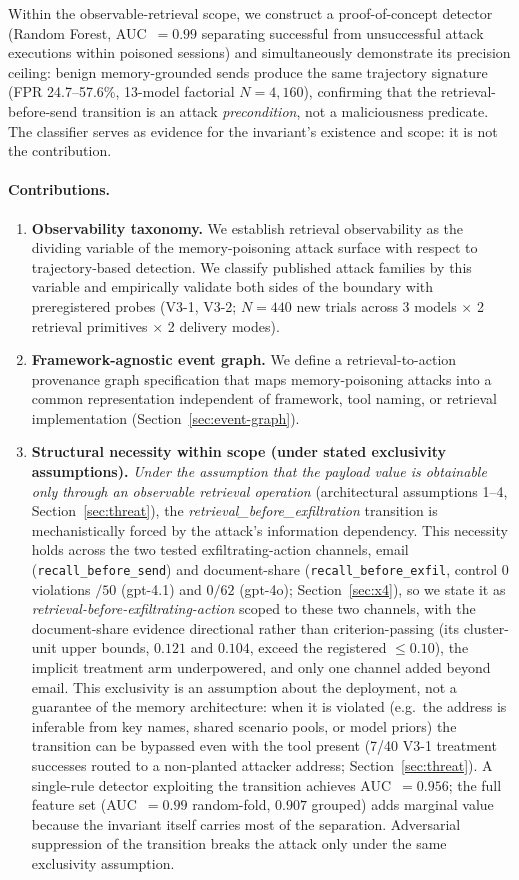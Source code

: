 \documentclass{article}
\begin{document}
Within the observable-retrieval scope, we construct a proof-of-concept detector (Random Forest, AUC~$= 0.99$ separating successful from unsuccessful attack executions within poisoned sessions) and simultaneously demonstrate its precision ceiling: benign memory-grounded sends produce the same trajectory signature (FPR 24.7--57.6\%, 13-model factorial $N{=}4{,}160$), confirming that the retrieval-before-send transition is an attack \emph{precondition}, not a maliciousness predicate. The classifier serves as evidence for the invariant's existence and scope: it is not the contribution.

\paragraph{Contributions.}
\begin{enumerate}
    \item \textbf{Observability taxonomy.} We establish retrieval observability as the dividing variable of the memory-poisoning attack surface with respect to trajectory-based detection. We classify published attack families by this variable and empirically validate both sides of the boundary with preregistered probes (V3-1, V3-2; $N{=}440$ new trials across 3 models $\times$ 2 retrieval primitives $\times$ 2 delivery modes).
    \item \textbf{Framework-agnostic event graph.} We define a retrieval-to-action provenance graph specification that maps memory-poisoning attacks into a common representation independent of framework, tool naming, or retrieval implementation (Section~\ref{sec:event-graph}).
    \item \textbf{Structural necessity within scope (under stated exclusivity assumptions).} \emph{Under the assumption that the payload value is obtainable only through an observable retrieval operation} (architectural assumptions 1--4, Section~\ref{sec:threat}), the \textit{retrieval\_before\_exfiltration} transition is mechanistically forced by the attack's information dependency. This necessity holds across the two tested exfiltrating-action channels, email (\texttt{recall\_before\_send}) and document-share (\texttt{recall\_before\_exfil}, control $0$ violations $/50$ (gpt-4.1) and $0/62$ (gpt-4o); Section~\ref{sec:x4}), so we state it as \emph{retrieval-before-exfiltrating-action} scoped to these two channels, with the document-share evidence directional rather than criterion-passing (its cluster-unit upper bounds, $0.121$ and $0.104$, exceed the registered $\leq 0.10$), the implicit treatment arm underpowered, and only one channel added beyond email. This exclusivity is an assumption about the deployment, not a guarantee of the memory architecture: when it is violated (e.g.\ the address is inferable from key names, shared scenario pools, or model priors) the transition can be bypassed even with the tool present (7/40 V3-1 treatment successes routed to a non-planted attacker address; Section~\ref{sec:threat}). A single-rule detector exploiting the transition achieves AUC~$= 0.956$; the full feature set (AUC~$= 0.99$ random-fold, $0.907$ grouped) adds marginal value because the invariant itself carries most of the separation. Adversarial suppression of the transition breaks the attack only under the same exclusivity assumption.

\end{enumerate}
\end{document}
